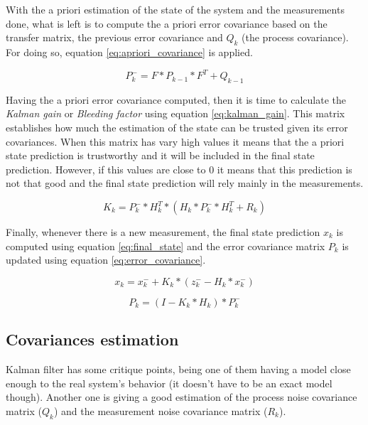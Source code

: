 With the a priori estimation of the state of the system and the measurements done, what is left is to compute the a priori error covariance \cite{OReilly} based on the transfer matrix, the previous error covariance and $Q_{k}$ (the process covariance). For doing so, equation \ref{eq:apriori_covariance} is applied.

\begin{equation}
P_{k}^{-}=F*P_{k-1}*F^{T}+Q_{k-1}
\label{eq:apriori_covariance}
\end{equation}

Having the a priori error covariance computed, then it is time to calculate the \emph{Kalman gain} or \emph{Bleeding factor} using equation \ref{eq:kalman_gain}. This matrix establishes how much the estimation of the state can be trusted given its error covariances. When this matrix has vary high values it means that the a priori state prediction is trustworthy and it will be included in the final state prediction. However, if this values are close to 0 it means that this prediction is not that good and the final state prediction will rely mainly in the measurements.

\begin{equation}
K_{k}=P_{k}^{-}*H_{k}^{T}*(H_{k}*P_{k}^{-}*H_{k}^{T}+R_{k})
\label{eq:kalman_gain}
\end{equation}

Finally, whenever there is a new measurement, the final state prediction $x_{k}$ is computed using equation \ref{eq:final_state} and the error covariance matrix $P_{k}$ is updated using equation \ref{eq:error_covariance}.

\begin{equation}
x_{k}=x_{k}^{-}+K_{k}*(z_{k}^{-}-H_{k}*x_{k}^{-})
\label{eq:final_state}
\end{equation}

\begin{equation}
P_{k}=(I-K_{k}*H_{k})*P_{k}^{-}
\label{eq:error_covariance}
\end{equation}

\subsection{Covariances estimation}
Kalman filter has some critique points, being one of them having a model close enough to the real system's behavior (it doesn't have to be an exact model though). Another one is giving a good estimation of the process noise covariance matrix ($Q_{k}$) and the measurement noise covariance matrix ($R_{k}$).\\

